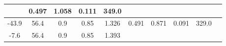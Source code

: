 \documentclass[a4paper,12pt]{article}
\begin{document}
\begin{longtable}{
     |
%    
    c|
%    
    c|
%    
    c|
%    
    c|
%    
    c|
%    
    c|
%    
    c|
%    
    c|
%    
    c|
%    
    c|
%    
    }
%        
        & 0.497
%        

%        

%        
        & 1.058
%        

%        

%        
        & 0.111
%        

%        

%        
        & 349.0
%        

%        
        \\
        \hline

        

%        

%        
        -43.9
%        

%        

%        
        & 56.4
%        

%        

%        
        & 0.9
%        

%        

%        
        & 0.85
%        

%        

%        
        & 1.326
%        

%        

%        
        & 0.491
%        

%        

%        
        & 0.871
%        

%        

%        
        & 0.091
%        

%        

%        
        & 329.0
%        

%        
        \\
        \hline

        

%        

%        
        -7.6
%        

%        

%        
        & 56.4
%        

%        

%        
        & 0.9
%        

%        

%        
        & 0.85
%        

%        

%        
        & 1.393
%        

%        


\end{longtable}
\end{document}
